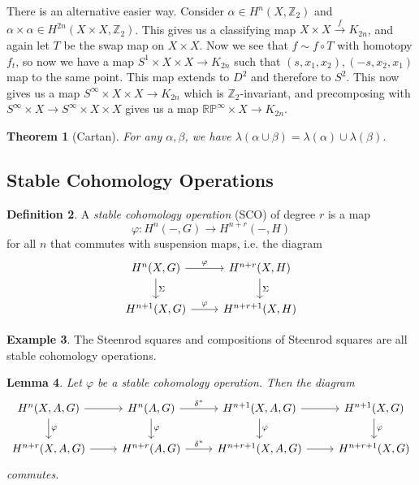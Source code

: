 \documentclass[leqno, openany]{memoir}
\newtheorem{thm}{Theorem}[section]
\newtheorem{lem}[thm]{Lemma}
\theoremstyle{definition}
\newtheorem{defn}[thm]{Definition}
\newtheorem{exm}[thm]{Example}
\theoremstyle{remark}
\theoremstyle{plain}
\theoremstyle{definition}
\theoremstyle{remark}
\newcommand{\R}{\mathbb{R}}
\newcommand{\Z}{\mathbb{Z}}
\renewcommand{\P}{\mathbb{P}}
\begin{document}
There is an alternative easier way. Consider $\alpha \in H^n(X, \Z_2)$ and $\alpha \times \alpha \in H^{2n}(X \times X, \Z_2)$. This gives us a classifying map $X \times X \xrightarrow{f} K_{2n}$, and again let $T$ be the swap map on $X \times X$. Now we see that $f \sim f \circ T$ with homotopy $f_t$, so now we have a map $S^1 \times X \times X \to K_{2n}$ such that $(s,x_1, x_2), (-s, x_2, x_1)$ map to the same point. This map extends to $D^2$ and therefore to $S^2$. This now gives us a map $S^{\infty} \times X \times X \to K_{2n}$ which is $\Z_2$-invariant, and precomposing with $S^{\infty} \times X \to S^{\infty} \times X \times X$ gives us a map $\R\P^{\infty} \times X \to K_{2n}$.

\begin{thm}[Cartan]
    For any $\alpha, \beta$, we have $\lambda(\alpha \cup \beta) = \lambda(\alpha) \cup \lambda(\beta)$.
\end{thm}

\subsection{Stable Cohomology Operations}%
\label{sub:stable_cohomology_operations}

\begin{defn}
    A \textit{stable cohomology operation} (SCO) of degree $r$ is a map
    \[ \varphi \colon H^n(-, G) \to H^{n+r}(-, H) \]
    for all $n$ that commutes with suspension maps, i.e. the diagram
    \begin{equation*}
    \begin{tikzcd}
        H^n(X, G) \ar{r}{\varphi} \ar{d}{\Sigma} & H^{n+r}(X, H) \ar{d}{\Sigma} \\
        H^{n+1}(X, G) \ar{r}{\varphi} & H^{n+r+1}(X, H)
    \end{tikzcd}
    \end{equation*}
\end{defn}

\begin{exm}
    The Steenrod squares and compositions of Steenrod squares are all stable cohomology operations.
\end{exm}

\begin{lem}
    Let $\varphi$ be a stable cohomology operation. Then the diagram
    \begin{equation*}
    \begin{tikzcd}
        H^n(X,A,G) \ar{r} \ar{d}{\varphi}& H^n(A, G) \ar{r}{\delta^*} \ar{d}{\varphi}& H^{n+1}(X,A,G) \ar{r} \ar{d}{\varphi}& H^{n+1}(X, G) \ar{d}{\varphi}\\
        H^{n+r}(X,A,G) \ar{r} & H^{n+r}(A, G) \ar{r}{\delta^*} & H^{n+r+1}(X,A,G) \ar{r} & H^{n+r+1}(X, G) 
    \end{tikzcd}
    \end{equation*}
    commutes.
\end{lem}
\end{document}
